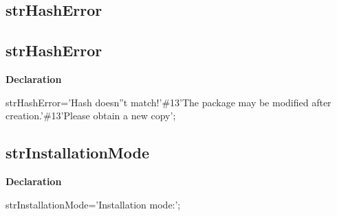 \documentclass{report}
\newif\ifpdf
\begin{document}
\subsection*{\large{\textbf{strHashError}}\normalsize\hspace{1ex}\hrulefill}
\else
\subsection*{strHashError}
\fi
\label{trstrings-strHashError}
\begin{list}{}{
\setlength{\itemindent}{0cm}
\setlength{\listparindent}{0cm}
\setlength{\leftmargin}{\evensidemargin}
\addtolength{\leftmargin}{\tmplength}
\settowidth{\labelsep}{X}
\addtolength{\leftmargin}{\labelsep}
\setlength{\labelwidth}{\tmplength}
}
\item[\textbf{Declaration}\hfill]
\ifpdf
\begin{flushleft}
\fi
\begin{ttfamily}
strHashError='Hash doesn''t match!'{\#}13'The package may be modified after creation.'{\#}13'Please obtain a new copy';\end{ttfamily}

\ifpdf
\end{flushleft}
\fi

\end{list}
\ifpdf
\subsection*{\large{\textbf{strInstallationMode}}\normalsize\hspace{1ex}\hrulefill}
\else
\subsection*{strInstallationMode}
\fi
\label{trstrings-strInstallationMode}
\begin{list}{}{
\setlength{\itemindent}{0cm}
\setlength{\listparindent}{0cm}
\setlength{\leftmargin}{\evensidemargin}
\addtolength{\leftmargin}{\tmplength}
\settowidth{\labelsep}{X}
\addtolength{\leftmargin}{\labelsep}
\setlength{\labelwidth}{\tmplength}
}
\item[\textbf{Declaration}\hfill]
\ifpdf
\begin{flushleft}
\fi
\begin{ttfamily}
strInstallationMode='Installation mode:';\end{ttfamily}

\ifpdf
\end{flushleft}
\fi

\end{list}
\ifpdf
\end{document}
